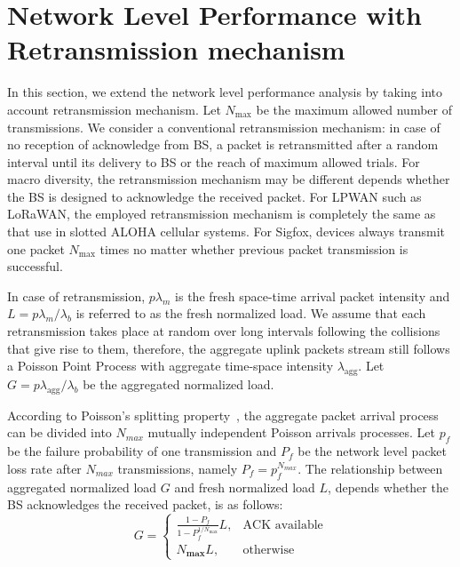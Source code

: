 \section{Network Level Performance with Retransmission mechanism}
\label{sec:op_over_infinite_plane_with_retransmission}
In this section, we extend the network level performance analysis by taking into account retransmission mechanism. Let $N_{\text{max}}$ be the maximum allowed number of transmissions. We consider a conventional retransmission mechanism: in case of no reception of acknowledge from BS, a packet is retransmitted after a random interval until its delivery to BS or the reach of maximum allowed trials. For macro diversity, the retransmission mechanism may be different depends whether the BS is designed to acknowledge the received packet. For LPWAN such as LoRaWAN, the employed retransmission mechanism is completely the same as that use in slotted ALOHA cellular systems. For Sigfox, devices always transmit one packet $N_{\text{max}}$ times no matter whether previous packet transmission is successful.

In case of retransmission, $p\lambda_{m}$ is the fresh space-time arrival packet intensity and $L = p\lambda_{m}/\lambda_{b}$ is referred to as the fresh normalized load. We assume that each retransmission takes place at random over long intervals following the collisions that give rise to them, therefore, the aggregate uplink packets stream still follows a Poisson Point Process with aggregate time-space intensity $\lambda_{\text{agg}}$. Let $G = p\lambda_{\text{agg}}/\lambda_{b}$ be the aggregated normalized load. 

According to Poisson's splitting property~\cite{meyn2012markov}, the aggregate packet arrival process can be divided into $N_{max}$ mutually independent Poisson arrivals processes. Let $p_{f}$ be the failure probability of one transmission and $P_{f}$ be the network level packet loss rate after $N_{max}$ transmissions, namely $P_{f} =  p_f^{N_{max}} $. The relationship between aggregated normalized load $G$ and fresh normalized load $L$, depends whether the BS acknowledges the received packet, is as follows:
\begin{equation}
\label{eq:relationship_intensity_fresh_agg}
	G=
	\begin{cases}
	\frac{ 1-P_f }{1-P_f^{1/N_{\text{max}}}} L, & \text{ACK available} \\
	N_{\textbf{max}} L , & \text{otherwise}
	\end{cases}
\end{equation}
